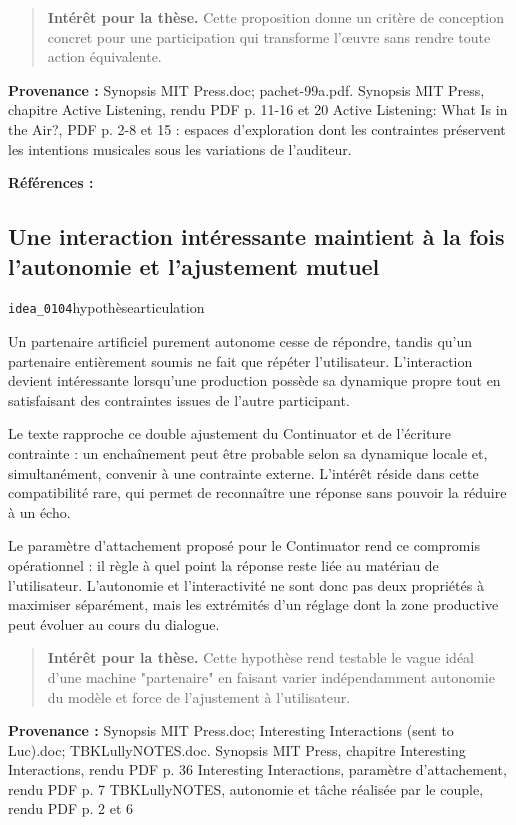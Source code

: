 \documentclass[10pt,a4paper]{article}
\begin{document}
\begin{quote}
\textbf{Intérêt pour la thèse.} Cette proposition donne un critère de conception concret pour une participation qui transforme l'œuvre sans rendre toute action équivalente.
\end{quote}
{\footnotesize\color{metadata}\textbf{Provenance :} Synopsis MIT Press.doc; pachet-99a.pdf. Synopsis MIT Press, chapitre Active Listening, rendu PDF p. 11-16 et 20 Active Listening: What Is in the Air?, PDF p. 2-8 et 15 : espaces d'exploration dont les contraintes préservent les intentions musicales sous les variations de l'auditeur.\par}
{\footnotesize\color{metadata}\textbf{Références :} \parencite{pachet1999active}\par}

\subsection{Une interaction intéressante maintient à la fois l'autonomie et l'ajustement mutuel}
{\small\color{metadata} \texttt{idea\_0104}\quad\textbullet\quad hypothèse\quad\textbullet\quad articulation\par}

Un partenaire artificiel purement autonome cesse de répondre, tandis qu'un partenaire entièrement soumis ne fait que répéter l'utilisateur. L'interaction devient intéressante lorsqu'une production possède sa dynamique propre tout en satisfaisant des contraintes issues de l'autre participant.

Le texte rapproche ce double ajustement du Continuator et de l'écriture contrainte : un enchaînement peut être probable selon sa dynamique locale et, simultanément, convenir à une contrainte externe. L'intérêt réside dans cette compatibilité rare, qui permet de reconnaître une réponse sans pouvoir la réduire à un écho.

Le paramètre d'attachement proposé pour le Continuator rend ce compromis opérationnel : il règle à quel point la réponse reste liée au matériau de l'utilisateur. L'autonomie et l'interactivité ne sont donc pas deux propriétés à maximiser séparément, mais les extrémités d'un réglage dont la zone productive peut évoluer au cours du dialogue.

\begin{quote}
\textbf{Intérêt pour la thèse.} Cette hypothèse rend testable le vague idéal d'une machine "partenaire" en faisant varier indépendamment autonomie du modèle et force de l'ajustement à l'utilisateur.
\end{quote}
{\footnotesize\color{metadata}\textbf{Provenance :} Synopsis MIT Press.doc; Interesting Interactions (sent to Luc).doc; TBKLullyNOTES.doc. Synopsis MIT Press, chapitre Interesting Interactions, rendu PDF p. 36 Interesting Interactions, paramètre d'attachement, rendu PDF p. 7 TBKLullyNOTES, autonomie et tâche réalisée par le couple, rendu PDF p. 2 et 6\par}
\end{document}
